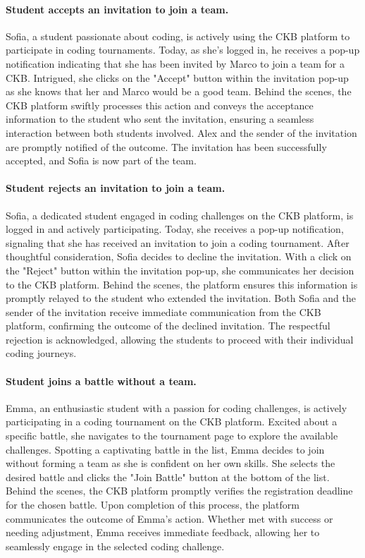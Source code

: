 \paragraph*{Student accepts an invitation to join a team.}
Sofia, a student passionate about coding, is actively using the CKB platform to participate in coding tournaments. 
Today, as she's logged in, he receives a pop-up notification indicating that she has been invited by Marco to join a team for a CKB.
Intrigued, she clicks on the "Accept" button within the invitation pop-up as she knows that her and Marco would be a good team. 
Behind the scenes, the CKB platform swiftly processes this action and conveys the acceptance information to the student who sent the invitation, ensuring a seamless interaction between both students involved.
Alex and the sender of the invitation are promptly notified of the outcome. 
The invitation has been successfully accepted, and Sofia is now part of the team.



\paragraph*{Student rejects an invitation to join a team.}
Sofia, a dedicated student engaged in coding challenges on the CKB platform, is logged in and actively participating. 
Today, she receives a pop-up notification, signaling that she has received an invitation to join a coding tournament.
After thoughtful consideration, Sofia decides to decline the invitation. 
With a click on the "Reject" button within the invitation pop-up, she communicates her decision to the CKB platform. 
Behind the scenes, the platform ensures this information is promptly relayed to the student who extended the invitation.
Both Sofia and the sender of the invitation receive immediate communication from the CKB platform, confirming the outcome of the declined invitation. 
The respectful rejection is acknowledged, allowing the students to proceed with their individual coding journeys.


\paragraph*{Student joins a battle without a team.}
Emma, an enthusiastic student with a passion for coding challenges, is actively participating in a coding tournament on the CKB platform. 
Excited about a specific battle, she navigates to the tournament page to explore the available challenges.
Spotting a captivating battle in the list, Emma decides to join without forming a team as she is confident on her own skills. 
She selects the desired battle and clicks the "Join Battle" button at the bottom of the list.
Behind the scenes, the CKB platform promptly verifies the registration deadline for the chosen battle. 
Upon completion of this process, the platform communicates the outcome of Emma's action. 
Whether met with success or needing adjustment, Emma receives immediate feedback, allowing her to seamlessly engage in the selected coding challenge.


